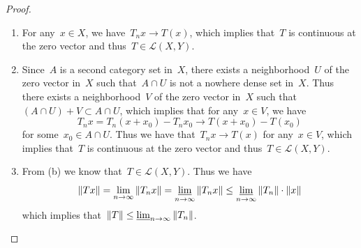 \documentclass[12pt,a4paper,draft]{article}  %
\theoremstyle{definition}
\numberwithin{equation}{section}
\begin{document}
\begin{proof}
    \begin{enumerate}
        \item For any~$x \in X$, we have~$T_n x \rightarrow T(x)$, which implies that~$T$ is continuous at the zero vector and thus~$T \in \mathcal{L}(X,Y)$.
        \item Since~$A$ is a second category set in~$X$, there exists a neighborhood~$U$ of the zero vector in~$X$ such that~$A \cap U$ is not a nowhere dense set in~$X$.
        Thus there exists a neighborhood~$V$ of the zero vector in~$X$ such that~$(A \cap U) + V \subset A \cap U$, which implies that for any~$x \in V$, we have
        $$ T_n x = T_n (x+x_0) - T_n x_0 \rightarrow T(x+x_0) - T(x_0) $$
        for some~$x_0 \in A \cap U$. Thus we have that~$T_n x \rightarrow T(x)$ for any~$x \in V$, which implies that~$T$ is continuous at the zero vector and thus~$T \in \mathcal{L}(X,Y)$.
        \item From (b) we know that~$T \in \mathcal{L}(X,Y)$. Thus we have
        $$ \|Tx\|=\lim_{n\to\infty} \|T_n x\| = \varliminf_{n\to\infty} \|T_n x\| \leq \varliminf_{n\to\infty} \|T_n\| \cdot \|x\| $$
        which implies that~$\|T\| \leq \varliminf_{n\to\infty} \|T_n\|$.
    \end{enumerate}
\end{proof}
\end{document}
